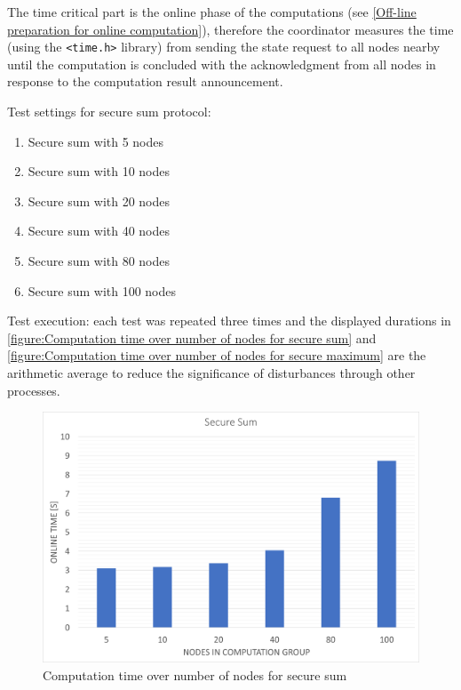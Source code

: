 The time critical part is the online phase of the computations (see \autoref{Off-line preparation for online computation}), therefore the coordinator measures the time (using the \lstinline|<time.h>| library) from sending the state request to all nodes nearby until the computation is concluded with the acknowledgment from all nodes in response to the computation result announcement.

Test settings for secure sum protocol:
\begin{enumerate}
	\item Secure sum with 5 nodes
	\item Secure sum with 10 nodes
	\item Secure sum with 20 nodes
	\item Secure sum with 40 nodes
	\item Secure sum with 80 nodes
	\item Secure sum with 100 nodes
\end{enumerate}

Test execution: each test was repeated three times and the displayed durations in \autoref{figure:Computation time over number of nodes for secure sum} and \autoref{figure:Computation time over number of nodes for secure maximum} are the arithmetic average to reduce the significance of disturbances through other processes.

\begin{figure}[!htbp] %
	\caption{Computation time over number of nodes for secure sum} \label{figure:Computation time over number of nodes for secure sum}
	\includegraphics[scale=1.0]{figures/eval_sum.png}
\end{figure}

